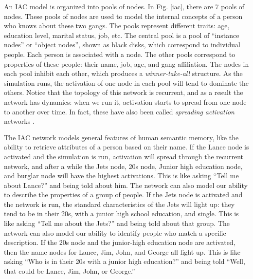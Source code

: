 An IAC model is organized into pools of nodes. In Fig. \ref{iac}, there are 7 pools of nodes. These pools of nodes are used to model the internal concepts of a person who knows about these two gangs. The pools represent different  traits:  age, education level, marital status,  job, etc. The central pool is a pool of ``instance nodes'' or ``object nodes'', shown as black disks, which correspond to individual people. Each person is associated with a node. The other pools correspond to properties of these people: their name, job, age, and gang affiliation. The nodes in each pool inhibit each other, which produces a \emph{winner-take-all} structure. As the simulation runs, the activation of one node in each pool will tend to dominate the others. Notice that the topology of this network is recurrent, and as a result the network has dynamics: when we run it, activation starts to spread from one node to another over time. In fact, these have also been called \emph{spreading activation} networks \cite{mcclelland1981retrieving}. 

The IAC network models general features of human semantic memory, like the ability to retrieve attributes of a person based on their name. If the Lance node is activated and the simulation is run, activation will spread through the recurrent network, and after a while the Jets node, 20s node, Junior high education node, and burglar node will have the highest activations. This is like asking ``Tell me about Lance?'' and being told about him. The network can also model our ability to describe the properties of a group of people. If the Jets node is activated and the network is run, the standard characteristics of the Jets will light up: they tend to be in their 20s, with a junior high school education, and single. This is like asking ``Tell me about the Jets?'' and being told about that group. The network can also model our ability to identify people who match a specific description. If the 20s node and the junior-high education node are activated, then the name nodes for Lance, Jim, John, and George all light up. This is like asking ``Who is in their 20s with a junior high education?'' and being told ``Well, that could be Lance, Jim, John, or George.''

